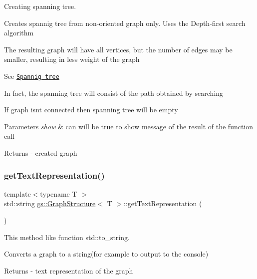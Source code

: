 Creating spanning tree. 

Creates spannig tree from non-\/oriented graph only. Uses the Depth-\/first search algorithm

The resulting graph will have all vertices, but the number of edges may be smaller, resulting in less weight of the graph

See \href{https://en.wikipedia.org/wiki/Spanning_tree}{\tt Spannig tree}

In fact, the spanning tree will consist of the path obtained by searching

If graph isn\textquotesingle{}t connected then spanning tree will be empty 
\begin{DoxyParams}{Parameters}
{\em show} & can will be true to show message of the result of the function call \\
\hline
\end{DoxyParams}
\begin{DoxyReturn}{Returns}
-\/ created graph 
\end{DoxyReturn}
\mbox{\label{classgs_1_1_graph_structure_afbecaabb4707e21a0018556100384e8f}} 
\subsubsection{\texorpdfstring{get\+Text\+Representation()}{getTextRepresentation()}}
{\footnotesize\ttfamily template$<$typename T $>$ \\
std\+::string \mbox{\hyperlink{classgs_1_1_graph_structure}{gs\+::\+Graph\+Structure}}$<$ T $>$\+::get\+Text\+Representation (\begin{DoxyParamCaption}{ }\end{DoxyParamCaption})}



This method like function std\+::to\+\_\+string. 

Converts a graph to a string(for example to output to the console) \begin{DoxyReturn}{Returns}
-\/ text representation of the graph 
\end{DoxyReturn}
\mbox{\label{classgs_1_1_graph_structure_a84565337bd8e3ca9a22512b3e7d0e4fb}} 

